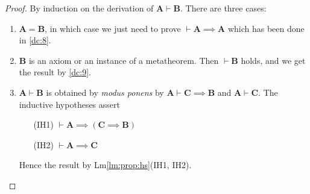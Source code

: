 \documentclass{amsart}%
\newcommand\metavariable[1]{\boldsymbol{#1}}
\begin{document}
\begin{proof}
By induction on the derivation of
$\metavariable{A}\vdash\metavariable{B}$. There are three cases:
\begin{enumerate}
\item $\metavariable{A}=\metavariable{B}$, in which case we just need to
  prove $\vdash\metavariable{A}\implies\metavariable{A}$ which has been
  done in \ref{dc:8}.
\item $\metavariable{B}$ is an axiom or an instance of a
  metatheorem. Then $\vdash\metavariable{B}$ holds, and we get the
  result by \ref{dc:9}.
\item $\metavariable{A}\vdash\metavariable{B}$ is obtained by
  \textit{modus ponens} by $\metavariable{A}\vdash\metavariable{C}\implies\metavariable{B}$
  and $\metavariable{A}\vdash\metavariable{C}$. The inductive hypotheses
  assert
  \begin{itemize}
  \item[(IH1)] $\vdash\metavariable{A}\implies(\metavariable{C}\implies\metavariable{B})$
  \item[(IH2)] $\vdash\metavariable{A}\implies\metavariable{C}$
  \end{itemize}
  Hence the result by Lm\ref{lm:prop:hs}(IH1, IH2).\qedhere

\end{enumerate}
\end{proof}
\end{document}
